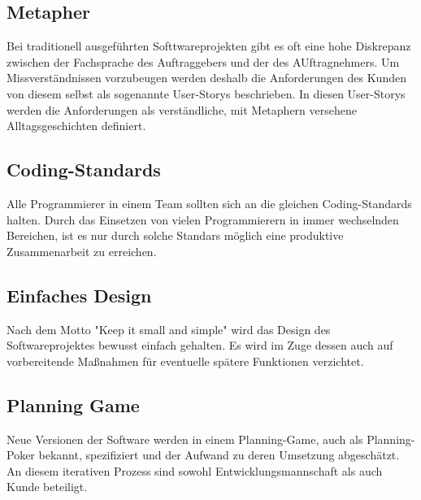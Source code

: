 \documentclass[a4paper, twopage]{scrreprt}
\begin{document}
\subsection{Metapher}
Bei traditionell ausgeführten Softtwareprojekten gibt es oft eine hohe Diskrepanz zwischen der Fachsprache des Auftraggebers und der des AUftragnehmers. Um Missverständnissen vorzubeugen werden deshalb die Anforderungen des Kunden von diesem selbst als sogenannte User-Storys beschrieben. In diesen User-Storys werden die Anforderungen als verständliche, mit Metaphern versehene Alltagsgeschichten definiert.
\subsection{Coding-Standards}
Alle Programmierer in einem Team sollten sich an die gleichen Coding-Standards halten. Durch das Einsetzen von vielen Programmierern in immer wechselnden Bereichen, ist es nur durch solche Standars möglich eine produktive Zusammenarbeit zu erreichen.
\subsection{Einfaches Design}
Nach dem Motto "Keep it small and simple" wird das Design des Softwareprojektes bewusst einfach gehalten. Es wird im Zuge dessen auch auf vorbereitende Maßnahmen für eventuelle spätere Funktionen verzichtet.
\subsection{Planning Game}
Neue Versionen der Software werden in einem Planning-Game, auch als Planning-Poker bekannt, spezifiziert und der Aufwand zu deren Umsetzung abgeschätzt. An diesem iterativen Prozess sind sowohl Entwicklungsmannschaft als auch Kunde beteiligt.\cite{wikipedia:xp}
\end{document}
